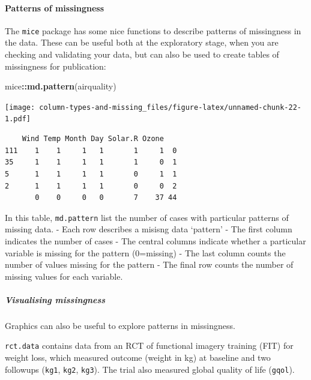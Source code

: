 \documentclass[]{article}
\newenvironment{Shaded}{\begin{snugshade}}{\end{snugshade}}
\newcommand{\KeywordTok}[1]{\textcolor[rgb]{0.13,0.29,0.53}{\textbf{#1}}}
\newcommand{\NormalTok}[1]{#1}
\newcommand{\OperatorTok}[1]{\textcolor[rgb]{0.81,0.36,0.00}{\textbf{#1}}}
\let\oldparagraph\paragraph
\renewcommand{\paragraph}[1]{\oldparagraph{#1}\mbox{}}
\let\oldsubparagraph\subparagraph
\renewcommand{\subparagraph}[1]{\oldsubparagraph{#1}\mbox{}}
\begin{document}
\hypertarget{patterns-of-missingness}{%
\paragraph{Patterns of missingness}\label{patterns-of-missingness}}

The \texttt{mice} package has some nice functions to describe patterns of missingness in the data. These can be useful both at the exploratory stage, when you are checking and validating your data, but can also be used to create tables of missingness for publication:

\begin{Shaded}
\begin{Highlighting}[]
\NormalTok{mice}\OperatorTok{::}\KeywordTok{md.pattern}\NormalTok{(airquality) }
\end{Highlighting}
\end{Shaded}

\texttt{[image: column-types-and-missing\_files/figure-latex/unnamed-chunk-22-1.pdf]}

\begin{verbatim}
    Wind Temp Month Day Solar.R Ozone   
111    1    1     1   1       1     1  0
35     1    1     1   1       1     0  1
5      1    1     1   1       0     1  1
2      1    1     1   1       0     0  2
       0    0     0   0       7    37 44
\end{verbatim}

In this table, \texttt{md.pattern} list the number of cases with particular patterns of missing data.
- Each row describes a misisng data `pattern'
- The first column indicates the number of cases
- The central columns indicate whether a particular variable is missing for the pattern (0=missing)
- The last column counts the number of values missing for the pattern
- The final row counts the number of missing values for each variable.

\hypertarget{visualising-missingness}{%
\subparagraph{Visualising missingness}\label{visualising-missingness}}

Graphics can also be useful to explore patterns in missingness.

\texttt{rct.data} contains data from an RCT of functional imagery training (FIT) for weight loss, which measured outcome (weight in kg) at baseline and two followups (\texttt{kg1}, \texttt{kg2}, \texttt{kg3}). The trial also measured global quality of life (\texttt{gqol}).
\end{document}
